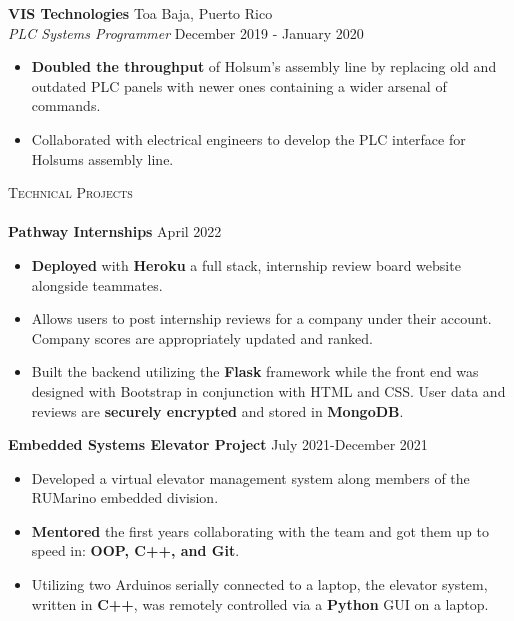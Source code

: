 \documentclass[a4paper]{article}
\newcommand{\lineunder} {
    \vspace*{-8pt} \\
    \hspace*{-18pt} \hrulefill \\
}
\newcommand{\header} [1] {
    {\hspace*{-18pt}\vspace*{6pt} \textsc{#1}}
    \vspace*{-6pt} \lineunder
}
\begin{document}
\textbf{VIS Technologies} \hfill Toa Baja, Puerto Rico\\
\textit{PLC Systems Programmer} \hfill December 2019 - January 2020\\
\vspace{-2mm}
\begin{itemize} \itemsep -1pt
	\item \textbf{Doubled the throughput} of Holsum's assembly line by replacing old and outdated PLC panels with newer ones containing a wider arsenal of commands.
	\item Collaborated with electrical engineers to develop the PLC interface for Holsum\textquotesingle{}s assembly line.
\end{itemize}

\header{Technical Projects}
{\textbf{Pathway Internships}} \hfill April 2022 \\
\vspace{-1mm}

\begin{itemize} \itemsep -1pt
\item \textbf{Deployed} with \textbf{Heroku} a full stack, internship review board website alongside teammates.

\item Allows users to post internship reviews for a company under their account. Company scores are appropriately updated and ranked.

\item Built the backend utilizing the \textbf{Flask} framework while the front end was designed with Bootstrap in conjunction with HTML and CSS. User data and reviews are \textbf{securely encrypted} and stored in \textbf{MongoDB}.
\end{itemize}

{\textbf{Embedded Systems Elevator Project}} \hfill \hfill July 2021-December 2021\\
\vspace{-1mm}

\begin{itemize} \itemsep -1pt
\item Developed a virtual elevator management system along members of the RUMarino embedded division.

\item \textbf{Mentored} the first years collaborating with the team and got them up to speed in: \textbf{OOP, C++, and Git}.

\item Utilizing two Arduinos serially connected to a laptop, the elevator system, written in \textbf{C++}, was remotely controlled via a \textbf{Python} GUI on a laptop.\\
\vspace*{-0.5mm}
\end{itemize}
\end{document}
